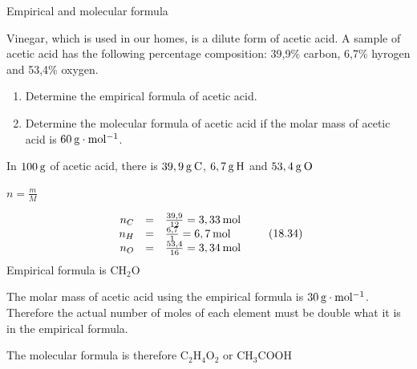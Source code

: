       \begin{wex}{Empirical and molecular formula
      }
 {
     \label{m38712*probfhsst!!!underscore!!!id1310}
      \label{m38712*id281533}Vinegar, which is used in our homes, is a dilute form of acetic acid. A sample of acetic acid has the following percentage composition: 39,9\% carbon, 6,7\% hyrogen and 53,4\% oxygen.\par 
      \label{m38712*id281540}\begin{enumerate}[noitemsep, label=\textbf{\arabic*}. ] 
            \leftskip=20pt\rightskip=\leftskip\label{m38712*uid71}\item Determine the empirical formula of acetic acid.
\label{m38712*uid72}\item Determine the molecular formula of acetic acid if the molar mass of acetic acid is $60\phantom{\rule{2pt}{0ex}}\mathrm{g}\ensuremath{\cdot}\mathrm{mol}{}^{-1}$.
\end{enumerate}
      \vspace{5pt}}
{
      \label{m38712*id281607}In $100\phantom{\rule{2pt}{0ex}}\mathrm{g}$ of acetic acid, there is $39,9\phantom{\rule{2pt}{0ex}}\mathrm{g}\phantom{\rule{2pt}{0ex}}\mathrm{C}$, $6,7\phantom{\rule{2pt}{0ex}}\mathrm{g}\phantom{\rule{2pt}{0ex}}\mathrm{H}$ and $53,4\phantom{\rule{2pt}{0ex}}\mathrm{g}\phantom{\rule{2pt}{0ex}}\mathrm{O}$\par 
      \pagebreak
      \label{m38712*id281633}
        $n=\frac{m}{M}$
      \par 
      \label{m38712*id281653}\nopagebreak\noindent{}
        
    \begin{equation}
    \begin{array}{ccc}\hfill {n}_{C}& =& \frac{39,9}{12}=3,33\phantom{\rule{2pt}{0ex}}\mathrm{mol}\hfill \\ \hfill {n}_{H}& =& \frac{6,7}{1}=6,7\phantom{\rule{2pt}{0ex}}\mathrm{mol}\hfill \\ \hfill {n}_{O}& =& \frac{53,4}{16}=3,34\phantom{\rule{2pt}{0ex}}\mathrm{mol}\hfill \end{array}\tag{18.34}
      \end{equation}
      \label{m38712*id281812}Empirical formula is $\mathrm{CH}{}_{2}\mathrm{O}$\par 
      \label{m38712*id281834}The molar mass of acetic acid using the empirical formula is $30\phantom{\rule{2pt}{0ex}}\mathrm{g}\ensuremath{\cdot}\mathrm{mol}{}^{-1}$. Therefore the actual number of moles of each element must be double what it is in the empirical formula.\par 
      \label{m38712*id281854}The molecular formula is therefore $\mathrm{C}{}_{2}\mathrm{H}{}_{4}\mathrm{O}{}_{2}$ or $\mathrm{CH}{}_{3}\mathrm{COOH}$\par 
}
    \end{wex}
